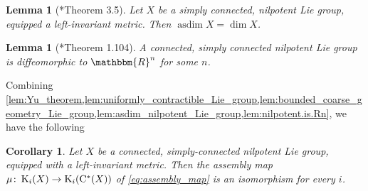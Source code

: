 \documentclass{amsart}
\numberwithin{figure}{section}
\numberwithin{equation}{section}
\numberwithin{table}{section}
\theoremstyle{plain}
\newtheorem{lemma}[equation]{Lemma}
\newtheorem{corollary}[equation]{Corollary}
\theoremstyle{definition}
\theoremstyle{remark}
\theoremstyle{nonumber}
\newcommand{\R}{\mathbb{R}}
\newcommand{\K}{\relax\ifmmode\operatorname{K}\else\textup{K}\fi}
\newcommand{\Cst}{\relax\ifmmode\mathrm{C}^*\else\textup{C*}\fi}
\renewcommand{\mathbb}{\mathbbm} %
\begin{document}
\begin{lemma}[\cite{Carlsson-Goldfarb:Homological_coherence}*{Theorem 3.5}]
\label{lem:asdim_nilpotent_Lie_group}
Let \( X \) be a simply connected, 
nilpotent Lie group, equipped a 
left-invariant metric. Then \( \operatorname{asdim} X=\dim X
\).  
\end{lemma}

\begin{lemma}[\cite{Knapp:Lie_groups_beyond_introduction}*{Theorem 1.104}]\label{lem:nilpotent.is.Rn}
A connected, simply connected nilpotent Lie group is diffeomorphic to \( \R^n \) for some \( n \).
\end{lemma}

Combining
\cref{lem:Yu_theorem,lem:uniformly_contractible_Lie_group,lem:bounded_coarse_geometry_Lie_group,lem:asdim_nilpotent_Lie_group,lem:nilpotent.is.Rn},
we have the following

\begin{corollary}\label{cor:contractible_nilpotent_coarse_Baum-Connes}
Let \( X \) be a connected, simply-connected nilpotent Lie group,
equipped with a left-invariant metric. Then the
assembly map \( \mu\colon \K_i(X)\to\K_i(\Cst(X)) \) of
\eqref{eq:assembly_map} is an isomorphism for
every \( i \). 
\end{corollary}


\end{document}
